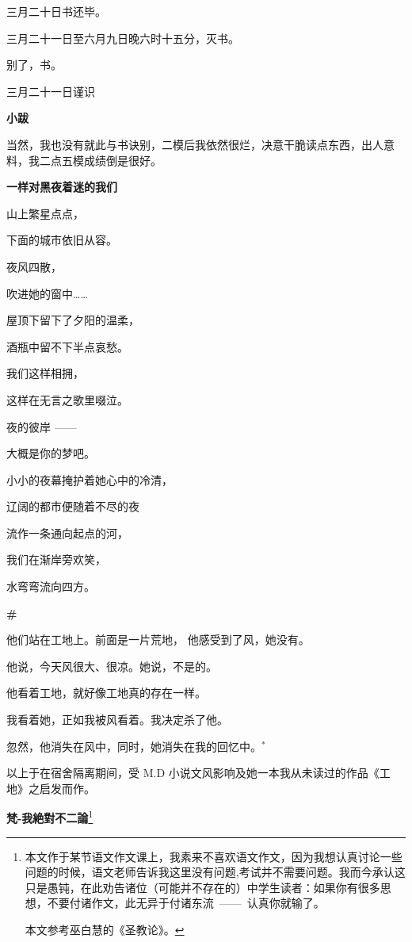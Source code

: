 \documentclass{ctexbook}
\begin{document}
\mbox


    三月二十日书还毕。

    三月二十一日至六月九日晚六时十五分，灭书。

    别了，书。

    {\hfill 三月二十一日谨识}


\mbox


    {\normalsize \textbf{小跋}}

    {\normalsize 当然，我也没有就此与书诀别，二模后我依然很烂，决意干脆读点东西，出人意料，我二点五模成绩倒是很好。}

\newpage
\textbf{一样对黑夜着迷的我们}


\mbox


    山上繁星点点，

    下面的城市依旧从容。

    夜风四散，

    吹进她的窗中……


    \mbox

    
    屋顶下留下了夕阳的温柔，

    酒瓶中留不下半点哀愁。

    我们这样相拥，

    这样在无言之歌里啜泣。

    夜的彼岸 ——

    大概是你的梦吧。


    \mbox

    
    小小的夜幕掩护着她心中的冷清，

    辽阔的都市便随着不尽的夜

    流作一条通向起点的河，

    我们在渐岸旁欢笑，

    水弯弯流向四方。

\newpage
\textbf{\#}

\mbox


    他们站在工地上。前面是一片荒地， 他感受到了风，她没有。


    他说，今天风很大、很凉。她说，不是的。


    他看着工地，就好像工地真的存在一样。


    我看着她，正如我被风看着。我决定杀了他。


    忽然，他消失在风中，同时，她消失在我的回忆中。\(^*\)


    {\normalsize * 以上于在宿舍隔离期间，受 M.D 小说文风影响及她一本我从未读过的作品《工地》之启发而作。}

\newpage
\textbf{梵-我絶對不二論}\footnote{\normalsize 本文作于某节语文作文课上，我素来不喜欢语文作文，因为我想认真讨论一些问题的时候，语文老师告诉我这里没有问题,考试并不需要问题。我而今承认这只是愚钝，在此劝告诸位（可能并不存在的）中学生读者：如果你有很多思想，不要付诸作文，此无异于付诸东流\ ——\ 认真你就输了。

本文参考巫白慧的《圣教论》。}
\end{document}
